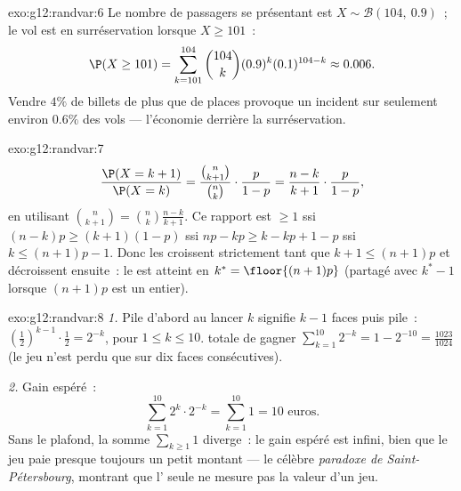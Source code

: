 \begin{solution}{exo:g12:randvar:6}
Le nombre de passagers se présentant est $X \sim \mathcal B(104,\ 0.9)$~;
le vol est en surréservation lorsque $X \geq 101$~:
\[
\P(X \geq 101) = \sum_{k=101}^{104}\binom{104}{k}(0.9)^k(0.1)^{104-k}
\approx 0.006 .
\]
Vendre $4\%$ de billets de plus que de places provoque un incident sur
seulement environ $0.6\%$ des vols --- l'économie derrière la
surréservation.
\end{solution}

\begin{solution}{exo:g12:randvar:7}
\[
\frac{\P(X = k+1)}{\P(X = k)}
= \frac{\binom{n}{k+1}}{\binom nk}\cdot\frac{p}{1-p}
= \frac{n - k}{k + 1}\cdot\frac{p}{1-p},
\]
en utilisant $\binom{n}{k+1} = \binom nk \frac{n-k}{k+1}$. Ce rapport est
$\geq 1$ ssi $(n-k)p \geq (k+1)(1-p)$ ssi $np - k p \geq k - kp + 1 - p$
ssi $k \leq (n+1)p - 1$. Donc les  croissent strictement tant
que $k + 1 \leq (n+1)p$ et décroissent ensuite~: le  est atteint en
$k^* = \floor{(n+1)p}$ (partagé avec $k^* - 1$ lorsque $(n+1)p$ est un
entier).
\end{solution}

\begin{solution}{exo:g12:randvar:8}
\emph{1.} Pile d'abord au lancer $k$ signifie $k-1$ faces puis pile~:
 $\left(\frac12\right)^{k-1}\cdot\frac12 = 2^{-k}$, pour
$1 \leq k \leq 10$.  totale de gagner
$\sum_{k=1}^{10} 2^{-k} = 1 - 2^{-10} = \frac{1023}{1024}$ (le jeu n'est
perdu que sur dix faces consécutives).

\emph{2.} Gain espéré~:
\[
\sum_{k=1}^{10} 2^k \cdot 2^{-k} = \sum_{k=1}^{10} 1 = 10 \text{ euros}.
\]
Sans le plafond, la somme $\sum_{k\geq1} 1$ diverge~: le gain espéré est
infini, bien que le jeu paie presque toujours un petit montant --- le
célèbre \emph{paradoxe de Saint-Pétersbourg}, montrant que l'
seule ne mesure pas la valeur d'un jeu.
\end{solution}

